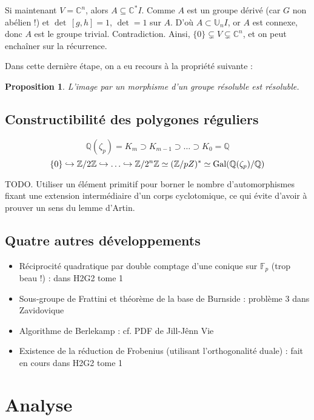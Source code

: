 \documentclass[a4paper, 11pt]{article}
\def\F{\mathbb{F}}
\def\Z{\mathbb{Z}}
\def\Q{\mathbb{Q}}
\def\C{\mathbb{C}}
\newtheorem*{proposition}{Proposition}
\begin{document}
Si maintenant $V = \C^n$, alors $A \subseteq \C^*I$. Comme $A$ est un groupe
dérivé (car $G$ non abélien !) et $\det\,[g,h] = 1$, $\det = 1$ sur $A$. D'où $A
\subset \mathbb{U}_nI$, or $A$ est connexe, donc $A$ est le groupe trivial.
Contradiction. Ainsi, $\{0\} \subsetneq V \subsetneq \C^n$, et on peut enchaîner
sur la récurrence.

Dans cette dernière étape, on a eu recours à la propriété suivante :
\begin{proposition}
  L'image par un morphisme d'un groupe résoluble est résoluble.
\end{proposition}

\newpage


\subsection{Constructibilité des polygones réguliers}

\[ \Q(\zeta_p) = K_m \supset K_{m-1} \supset \ldots \supset K_0 = \Q \]
\[ \{0\} \hookrightarrow \Z/2\Z \hookrightarrow \ldots \hookrightarrow \Z/2^n\Z
  \simeq (\Z/pZ)^* \simeq \textnormal{Gal}(\Q(\zeta_p)/\Q) \]

TODO. Utiliser un élément primitif pour borner le nombre d'automorphismes fixant
une extension intermédiaire d'un corps cyclotomique, ce qui évite d'avoir à
prouver un sens du lemme d'Artin.


\subsection{Quatre autres développements}

\begin{itemize}
\item Réciprocité quadratique par double comptage d'une conique sur $\F_p$ (trop
  beau !) : dans H2G2 tome 1
\item Sous-groupe de Frattini et théorème de la base de Burnside : problème 3
  dans Zavidovique
\item Algorithme de Berlekamp : cf. PDF de Jill-Jênn Vie
\item Existence de la réduction de Frobenius (utilisant l'orthogonalité duale) :
  fait en cours dans H2G2 tome 1
\end{itemize}


\newpage

\section{Analyse}
\end{document}
